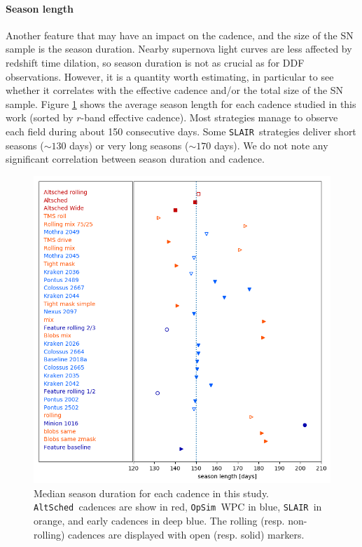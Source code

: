 \documentclass [11pt,a4paper]{article}
\newcommand{\opsim}{{\tt OpSim\ }}
\newcommand{\slair}{{\tt SLAIR\ }}
\newcommand{\altsched}{{\tt AltSched\ }}
\begin{document}
\paragraph{Season length} Another feature that may have an impact on the cadence, and the size of the SN sample
is the season duration.  Nearby supernova light curves are less
affected by redshift time dilation, so season duration is not as
crucial as for DDF observations.  However, it is a quantity worth
estimating, in particular to see whether it correlates with the
effective cadence and/or the total size of the SN sample.
Figure \ref{fig:season_length} shows the average season length for
each cadence studied in this work (sorted by $r$-band effective
cadence).  Most strategies manage to observe each field during about
150 consecutive days. Some \slair strategies deliver short seasons
($\sim 130$ days) or very long seasons ($\sim 170$ days). We do not
note any significant correlation between season duration and cadence.

\begin{figure}
  \begin{center}
    \includegraphics[width=0.8\linewidth]{Figures/season_length.png}
    \caption{Median season duration for each cadence in this
      study. \altsched cadences are show in red, \opsim WPC in blue,
      \slair in orange, and early cadences in deep blue. The rolling
      (resp. non-rolling) cadences are displayed with open
      (resp. solid) markers. }
    \label{fig:season_length}
  \end{center}
\end{figure}
\end{document}
